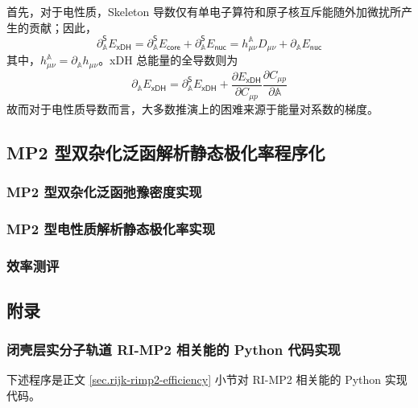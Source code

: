 首先，对于电性质，Skeleton 导数仅有单电子算符和原子核互斥能随外加微扰所产生的贡献；因此，
\begin{equation}
  \partial_\mathbb{A}^\textsf{S} E_\textsf{xDH} = \partial_\mathbb{A}^\textsf{S} E_\textsf{core} + \partial_\mathbb{A}^\textsf{S} E_\textsf{nuc} = h_{\mu \nu}^\mathbb{A} D_{\mu \nu} + \partial_\mathbb{A} E_\textsf{nuc}
\end{equation}
其中，$h_{\mu \nu}^\mathbb{A} = \partial_\mathbb{A} h_{\mu \nu}$。xDH 总能量的全导数则为
\begin{equation}
  \partial_\mathbb{A} E_\textsf{xDH} = \partial_\mathbb{A}^\textsf{S} E_\textsf{xDH} + \frac{\partial E_\textsf{xDH}}{\partial C_{\mu p}} \frac{\partial C_{\mu p}}{\partial \mathbb{A}}
\end{equation}
故而对于电性质导数而言，大多数推演上的困难来源于能量对系数的梯度。



\subsection{MP2 型双杂化泛函解析静态极化率程序化}
\label{sec.3.program}

\subsubsection{MP2 型双杂化泛函弛豫密度实现}

\subsubsection{MP2 型电性质解析静态极化率实现}

\subsubsection{效率测评}

\newpage

\subsection{附录}

\subsubsection{闭壳层实分子轨道 RI-MP2 相关能的 Python 代码实现}
\label{sec.python-ri-mp2}

下述程序是正文 \ref{sec.rijk-rimp2-efficiency} 小节对 RI-MP2 相关能的 Python 实现代码。

